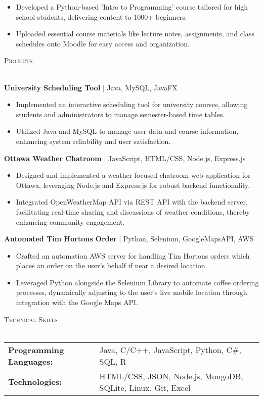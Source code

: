 \documentclass[a4paper]{article}
\newcommand{\lineunder} {
    \vspace*{-8pt} \\
    \hspace*{-18pt} \hrulefill \\
}
\newcommand{\header} [1] {
    {\hspace*{-18pt}\vspace*{6pt} \textsc{#1}}
    \vspace*{-6pt} \lineunder
}
\begin{document}
\vspace{-1mm}
\begin{itemize} \itemsep 1pt
    \item Developed a Python-based 'Intro to Programming' course tailored for high school students, delivering content to 1000+ beginners.
    \item Uploaded essential course materials like lecture notes, assignments, and class schedules onto Moodle for easy access and organization.
\end{itemize}



\header{Projects}
\vspace{1mm}

{\textbf{University Scheduling Tool} | Java, MySQL, JavaFX}\\
\vspace{-1mm}
\begin{itemize} \itemsep 1pt
    \item Implemented an interactive scheduling tool for university courses, allowing students and administrators to manage semester-based time tables.
    \item Utilized Java and MySQL to manage user data and course information, enhancing system reliability and user satisfaction.
\end{itemize}
\vspace*{2mm}

{\textbf{Ottawa Weather Chatroom} | JavaScript, HTML/CSS, Node.js, Express.js}\\
\vspace{-1mm}
\begin{itemize} \itemsep 1pt
    \item Designed and implemented a weather-focused chatroom web application for Ottawa, leveraging Node.js and Express.js for robust backend functionality.
    \item Integrated OpenWeatherMap API via REST API with the backend server, facilitating real-time sharing and discussions of weather conditions, thereby enhancing community engagement.
\end{itemize}
\vspace*{2mm}

{\textbf{Automated Tim Hortons Order} | Python, Selenium, GoogleMapsAPI, AWS}\\
\vspace{-1mm}
\begin{itemize} \itemsep 1pt
    \item Crafted an automation AWS server for handling Tim Hortons orders which places an order on the user's behalf if near a desired location.
    \item Leveraged Python alongside the Selenium Library to automate coffee ordering processes, dynamically adjusting to the user's live mobile location through integration with the Google Maps API.
\end{itemize}
\vspace*{2mm}

\header{Technical Skills}
\begin{tabular}{ l l }
    \textbf{Programming Languages:} & Java, C/C++, JavaScript, Python, C\#, SQL, R         \\
    \textbf{Technologies: }         & HTML/CSS, JSON, Node.js, MongoDB, SQLite, Linux, Git, Excel \\
\end{tabular}
\vspace{2mm}
\end{document}
